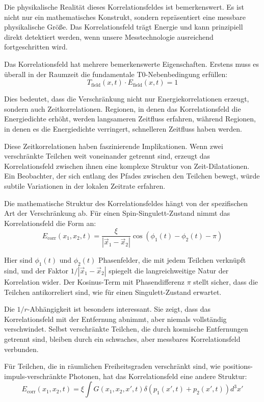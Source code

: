 \documentclass[12pt,a4paper]{article}
\newcommand{\xipar}{\xi}
\theoremstyle{definition}
\theoremstyle{remark}
\begin{document}
Die physikalische Realität dieses Korrelationsfeldes ist bemerkenswert. Es ist nicht nur ein mathematisches Konstrukt, sondern repräsentiert eine messbare physikalische Größe. Das Korrelationsfeld trägt Energie und kann prinzipiell direkt detektiert werden, wenn unsere Messtechnologie ausreichend fortgeschritten wird.

Das Korrelationsfeld hat mehrere bemerkenswerte Eigenschaften. Erstens muss es überall in der Raumzeit die fundamentale T0-Nebenbedingung erfüllen:
$$T_{\text{field}}(x,t) \cdot E_{\text{field}}(x,t) = 1$$

Dies bedeutet, dass die Verschränkung nicht nur Energiekorrelationen erzeugt, sondern auch Zeitkorrelationen. Regionen, in denen das Korrelationsfeld die Energiedichte erhöht, werden langsameren Zeitfluss erfahren, während Regionen, in denen es die Energiedichte verringert, schnelleren Zeitfluss haben werden.

Diese Zeitkorrelationen haben faszinierende Implikationen. Wenn zwei verschränkte Teilchen weit voneinander getrennt sind, erzeugt das Korrelationsfeld zwischen ihnen eine komplexe Struktur von Zeit-Dilatationen. Ein Beobachter, der sich entlang des Pfades zwischen den Teilchen bewegt, würde subtile Variationen in der lokalen Zeitrate erfahren.

Die mathematische Struktur des Korrelationsfeldes hängt von der spezifischen Art der Verschränkung ab. Für einen Spin-Singulett-Zustand nimmt das Korrelationsfeld die Form an:
\begin{equation}
	E_{\text{corr}}(x_1,x_2,t) = \frac{\xipar}{|\vec{x}_1 - \vec{x}_2|} \cos(\phi_1(t) - \phi_2(t) - \pi)
	\label{eq:singlet_correlation}
\end{equation}

Hier sind $\phi_1(t)$ und $\phi_2(t)$ Phasenfelder, die mit jedem Teilchen verknüpft sind, und der Faktor $1/|\vec{x}_1 - \vec{x}_2|$ spiegelt die langreichweitige Natur der Korrelation wider. Der Kosinus-Term mit Phasendifferenz $\pi$ stellt sicher, dass die Teilchen antikorreliert sind, wie für einen Singulett-Zustand erwartet.

Die $1/r$-Abhängigkeit ist besonders interessant. Sie zeigt, dass das Korrelationsfeld mit der Entfernung abnimmt, aber niemals vollständig verschwindet. Selbst verschränkte Teilchen, die durch kosmische Entfernungen getrennt sind, bleiben durch ein schwaches, aber messbares Korrelationsfeld verbunden.

Für Teilchen, die in räumlichen Freiheitsgraden verschränkt sind, wie positions-impuls-verschränkte Photonen, hat das Korrelationsfeld eine andere Struktur:
\begin{equation}
	E_{\text{corr}}(x_1,x_2,t) = \xipar \int G(x_1,x_2,x',t) \delta(p_1(x',t) + p_2(x',t)) d^3x'
	\label{eq:position_momentum_correlation}
\end{equation}
\end{document}
